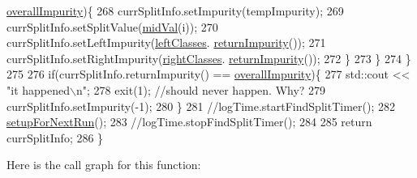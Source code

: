 \begin{DoxyCode}
      \hyperlink{classfp_1_1split_a1eba74d8afed2852da3eb004afe76bb7}{overallImpurity})\{
268                                 currSplitInfo.setImpurity(tempImpurity);
269                                 currSplitInfo.setSplitValue(\hyperlink{classfp_1_1split_a0a8bc35b7ff78cb96332cdbda12b5fe5}{midVal}(i));
270                                 currSplitInfo.setLeftImpurity(\hyperlink{classfp_1_1split_a3be6dcf32281715e6376e9f5f8da18f0}{leftClasses}.
      \hyperlink{classfp_1_1classTotals_a82993575e2ad13f057f01050a52ef4ce}{returnImpurity}());
271                                 currSplitInfo.setRightImpurity(\hyperlink{classfp_1_1split_af5366297f7de9b8ff0911186300bab7e}{rightClasses}.
      \hyperlink{classfp_1_1classTotals_a82993575e2ad13f057f01050a52ef4ce}{returnImpurity}());
272                             \}
273                         \}
274                     \}
275 
276                     \textcolor{keywordflow}{if}(currSplitInfo.returnImpurity() == \hyperlink{classfp_1_1split_a1eba74d8afed2852da3eb004afe76bb7}{overallImpurity})\{
277                         std::cout << \textcolor{stringliteral}{"it happened\(\backslash\)n"};
278 exit(1); \textcolor{comment}{//should never happen.  Why?}
279                                 currSplitInfo.setImpurity(-1);
280                     \}
281                     \textcolor{comment}{//logTime.startFindSplitTimer();}
282                     \hyperlink{classfp_1_1split_a5ccfceb36e8ea567816af95bb4ae4fea}{setupForNextRun}();
283                     \textcolor{comment}{//logTime.stopFindSplitTimer();}
284 
285                     \textcolor{keywordflow}{return} currSplitInfo;
286                 \}
\end{DoxyCode}
Here is the call graph for this function\+:\nopagebreak
